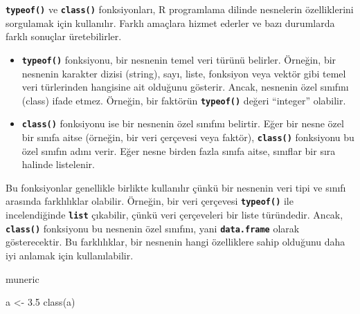 \documentclass[
  letterpaper,
  DIV=11,
  numbers=noendperiod]{scrreprt}
\newenvironment{Shaded}{\begin{snugshade}}{\end{snugshade}}
\newcommand{\FloatTok}[1]{\textcolor[rgb]{0.68,0.00,0.00}{#1}}
\newcommand{\FunctionTok}[1]{\textcolor[rgb]{0.28,0.35,0.67}{#1}}
\newcommand{\NormalTok}[1]{\textcolor[rgb]{0.00,0.23,0.31}{#1}}
\newcommand{\OtherTok}[1]{\textcolor[rgb]{0.00,0.23,0.31}{#1}}
\begin{document}
\begin{tcolorbox}[enhanced jigsaw, arc=.35mm, colback=white, opacityback=0, leftrule=.75mm, left=2mm, colframe=quarto-callout-important-color-frame, rightrule=.15mm, breakable, bottomtitle=1mm, title=\textcolor{quarto-callout-important-color}{\faExclamation}\hspace{0.5em}{Önemli}, toptitle=1mm, titlerule=0mm, colbacktitle=quarto-callout-important-color!10!white, bottomrule=.15mm, opacitybacktitle=0.6, toprule=.15mm, coltitle=black]

\textbf{\texttt{typeof()}} ve \textbf{\texttt{class()}} fonksiyonları, R
programlama dilinde nesnelerin özelliklerini sorgulamak için kullanılır.
Farklı amaçlara hizmet ederler ve bazı durumlarda farklı sonuçlar
üretebilirler.

\begin{itemize}
\item
  \textbf{\texttt{typeof()}} fonksiyonu, bir nesnenin temel veri türünü
  belirler. Örneğin, bir nesnenin karakter dizisi (string), sayı, liste,
  fonksiyon veya vektör gibi temel veri türlerinden hangisine ait
  olduğunu gösterir. Ancak, nesnenin özel sınıfını (class) ifade etmez.
  Örneğin, bir faktörün \textbf{\texttt{typeof()}} değeri ``integer''
  olabilir.
\item
  \textbf{\texttt{class()}} fonksiyonu ise bir nesnenin özel sınıfını
  belirtir. Eğer bir nesne özel bir sınıfa aitse (örneğin, bir veri
  çerçevesi veya faktör), \textbf{\texttt{class()}} fonksiyonu bu özel
  sınıfın adını verir. Eğer nesne birden fazla sınıfa aitse, sınıflar
  bir sıra halinde listelenir.
\end{itemize}

Bu fonksiyonlar genellikle birlikte kullanılır çünkü bir nesnenin veri
tipi ve sınıfı arasında farklılıklar olabilir. Örneğin, bir veri
çerçevesi \textbf{\texttt{typeof()}} ile incelendiğinde
\textbf{\texttt{list}} çıkabilir, çünkü veri çerçeveleri bir liste
türündedir. Ancak, \textbf{\texttt{class()}} fonksiyonu bu nesnenin özel
sınıfını, yani \textbf{\texttt{data.frame}} olarak gösterecektir. Bu
farklılıklar, bir nesnenin hangi özelliklere sahip olduğunu daha iyi
anlamak için kullanılabilir.

\end{tcolorbox}

muneric

\begin{Shaded}
\begin{Highlighting}[]
\NormalTok{a }\OtherTok{\textless{}{-}} \FloatTok{3.5}
\FunctionTok{class}\NormalTok{(a)}
\end{Highlighting}
\end{Shaded}
\end{document}
